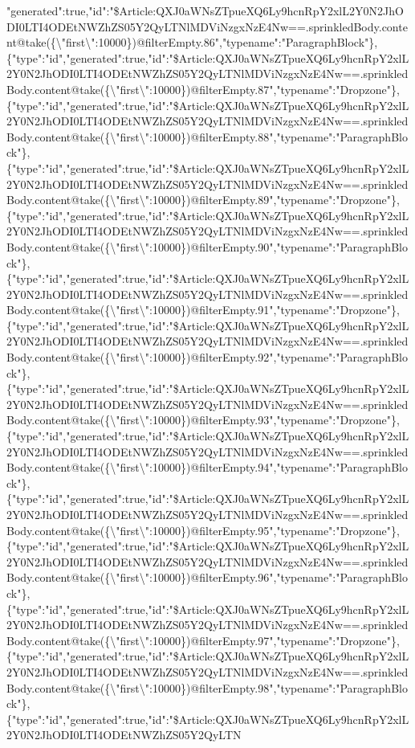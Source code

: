 "generated":true,"id":"\$Article:QXJ0aWNsZTpueXQ6Ly9hcnRpY2xlL2Y0N2JhODI0LTI4ODEtNWZhZS05Y2QyLTNlMDViNzgxNzE4Nw==.sprinkledBody.content@take(\{\textbackslash{}"first\textbackslash{}":10000\})@filterEmpty.86","typename":"ParagraphBlock"\},\{"type":"id","generated":true,"id":"\$Article:QXJ0aWNsZTpueXQ6Ly9hcnRpY2xlL2Y0N2JhODI0LTI4ODEtNWZhZS05Y2QyLTNlMDViNzgxNzE4Nw==.sprinkledBody.content@take(\{\textbackslash{}"first\textbackslash{}":10000\})@filterEmpty.87","typename":"Dropzone"\},\{"type":"id","generated":true,"id":"\$Article:QXJ0aWNsZTpueXQ6Ly9hcnRpY2xlL2Y0N2JhODI0LTI4ODEtNWZhZS05Y2QyLTNlMDViNzgxNzE4Nw==.sprinkledBody.content@take(\{\textbackslash{}"first\textbackslash{}":10000\})@filterEmpty.88","typename":"ParagraphBlock"\},\{"type":"id","generated":true,"id":"\$Article:QXJ0aWNsZTpueXQ6Ly9hcnRpY2xlL2Y0N2JhODI0LTI4ODEtNWZhZS05Y2QyLTNlMDViNzgxNzE4Nw==.sprinkledBody.content@take(\{\textbackslash{}"first\textbackslash{}":10000\})@filterEmpty.89","typename":"Dropzone"\},\{"type":"id","generated":true,"id":"\$Article:QXJ0aWNsZTpueXQ6Ly9hcnRpY2xlL2Y0N2JhODI0LTI4ODEtNWZhZS05Y2QyLTNlMDViNzgxNzE4Nw==.sprinkledBody.content@take(\{\textbackslash{}"first\textbackslash{}":10000\})@filterEmpty.90","typename":"ParagraphBlock"\},\{"type":"id","generated":true,"id":"\$Article:QXJ0aWNsZTpueXQ6Ly9hcnRpY2xlL2Y0N2JhODI0LTI4ODEtNWZhZS05Y2QyLTNlMDViNzgxNzE4Nw==.sprinkledBody.content@take(\{\textbackslash{}"first\textbackslash{}":10000\})@filterEmpty.91","typename":"Dropzone"\},\{"type":"id","generated":true,"id":"\$Article:QXJ0aWNsZTpueXQ6Ly9hcnRpY2xlL2Y0N2JhODI0LTI4ODEtNWZhZS05Y2QyLTNlMDViNzgxNzE4Nw==.sprinkledBody.content@take(\{\textbackslash{}"first\textbackslash{}":10000\})@filterEmpty.92","typename":"ParagraphBlock"\},\{"type":"id","generated":true,"id":"\$Article:QXJ0aWNsZTpueXQ6Ly9hcnRpY2xlL2Y0N2JhODI0LTI4ODEtNWZhZS05Y2QyLTNlMDViNzgxNzE4Nw==.sprinkledBody.content@take(\{\textbackslash{}"first\textbackslash{}":10000\})@filterEmpty.93","typename":"Dropzone"\},\{"type":"id","generated":true,"id":"\$Article:QXJ0aWNsZTpueXQ6Ly9hcnRpY2xlL2Y0N2JhODI0LTI4ODEtNWZhZS05Y2QyLTNlMDViNzgxNzE4Nw==.sprinkledBody.content@take(\{\textbackslash{}"first\textbackslash{}":10000\})@filterEmpty.94","typename":"ParagraphBlock"\},\{"type":"id","generated":true,"id":"\$Article:QXJ0aWNsZTpueXQ6Ly9hcnRpY2xlL2Y0N2JhODI0LTI4ODEtNWZhZS05Y2QyLTNlMDViNzgxNzE4Nw==.sprinkledBody.content@take(\{\textbackslash{}"first\textbackslash{}":10000\})@filterEmpty.95","typename":"Dropzone"\},\{"type":"id","generated":true,"id":"\$Article:QXJ0aWNsZTpueXQ6Ly9hcnRpY2xlL2Y0N2JhODI0LTI4ODEtNWZhZS05Y2QyLTNlMDViNzgxNzE4Nw==.sprinkledBody.content@take(\{\textbackslash{}"first\textbackslash{}":10000\})@filterEmpty.96","typename":"ParagraphBlock"\},\{"type":"id","generated":true,"id":"\$Article:QXJ0aWNsZTpueXQ6Ly9hcnRpY2xlL2Y0N2JhODI0LTI4ODEtNWZhZS05Y2QyLTNlMDViNzgxNzE4Nw==.sprinkledBody.content@take(\{\textbackslash{}"first\textbackslash{}":10000\})@filterEmpty.97","typename":"Dropzone"\},\{"type":"id","generated":true,"id":"\$Article:QXJ0aWNsZTpueXQ6Ly9hcnRpY2xlL2Y0N2JhODI0LTI4ODEtNWZhZS05Y2QyLTNlMDViNzgxNzE4Nw==.sprinkledBody.content@take(\{\textbackslash{}"first\textbackslash{}":10000\})@filterEmpty.98","typename":"ParagraphBlock"\},\{"type":"id","generated":true,"id":"\$Article:QXJ0aWNsZTpueXQ6Ly9hcnRpY2xlL2Y0N2JhODI0LTI4ODEtNWZhZS05Y2QyLTN